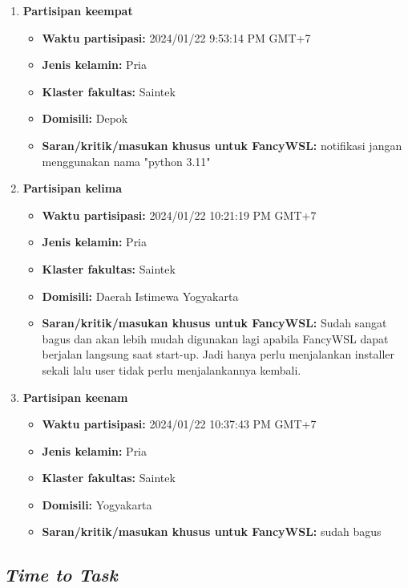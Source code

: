 \begin{enumerate}
\begin{itemize}
    \end{itemize}

    \item \textbf{Partisipan keempat}
    \begin{itemize}
        \item \textbf{Waktu partisipasi:} 2024/01/22 9:53:14 PM GMT+7
        \item \textbf{Jenis kelamin:} Pria
        \item \textbf{Klaster fakultas:} Saintek
        \item \textbf{Domisili:} Depok
        \item \textbf{Saran/kritik/masukan khusus untuk FancyWSL:} notifikasi jangan menggunakan nama "python 3.11"
    \end{itemize}

    \item \textbf{Partisipan kelima}
    \begin{itemize}
        \item \textbf{Waktu partisipasi:} 2024/01/22 10:21:19 PM GMT+7
        \item \textbf{Jenis kelamin:} Pria
        \item \textbf{Klaster fakultas:} Saintek
        \item \textbf{Domisili:} Daerah Istimewa Yogyakarta
        \item \textbf{Saran/kritik/masukan khusus untuk FancyWSL:} Sudah sangat bagus dan akan lebih mudah digunakan lagi apabila FancyWSL dapat berjalan langsung saat start-up. Jadi hanya perlu menjalankan installer sekali lalu user tidak perlu menjalankannya kembali.
    \end{itemize}

    \item \textbf{Partisipan keenam}
    \begin{itemize}
        \item \textbf{Waktu partisipasi:} 2024/01/22 10:37:43 PM GMT+7
        \item \textbf{Jenis kelamin:} Pria
        \item \textbf{Klaster fakultas:} Saintek
        \item \textbf{Domisili:} Yogyakarta
        \item \textbf{Saran/kritik/masukan khusus untuk FancyWSL:} sudah bagus
    \end{itemize}
\end{enumerate}

\subsection{\textit{Time to Task}}

